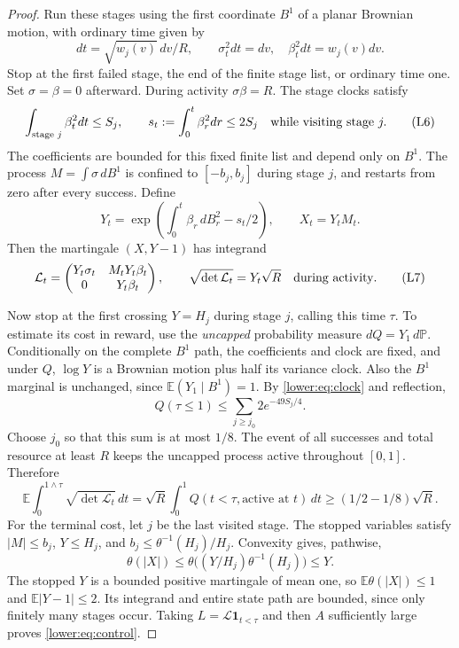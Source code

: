 \documentclass[11pt]{article}
\newcommand{\E}{\mathbb E}
\newcommand{\PP}{\mathbb P}
\numberwithin{equation}{section}
\begin{document}
\begin{proof}
Run these stages using the first coordinate \(B^1\) of a planar
Brownian motion, with ordinary time given by
\[
 dt=\sqrt{w_j(v)}\,dv/R,\qquad
 \sigma_t^2dt=dv,\quad \beta_t^2dt=w_j(v)dv.
\]
Stop at the first failed stage, the end of the finite stage list, or
ordinary time one.  Set \(\sigma=\beta=0\) afterward.  During activity
\(\sigma\beta=R\).  The stage clocks satisfy
\[
 \int_{\text{stage }j}\beta_t^2dt\le S_j,
 \qquad s_t:=\int_0^t\beta_r^2dr\le2S_j
       \quad\hbox{while visiting stage }j.
 \tag{L6}\label{lower:eq:clock}
\]
The coefficients are bounded for this fixed finite list and depend
only on \(B^1\).  The process \(M=\int\sigma\,dB^1\) is confined
to \([-b_j,b_j]\) during stage \(j\), and restarts from zero after
every success.  Define
\[
 Y_t=\exp\left(\int_0^t\beta_r\,dB_r^2-s_t/2\right),
 \qquad X_t=Y_tM_t.
\]
Then the martingale \((X,Y-1)\) has integrand
\[
 \mathcal L_t=
 \begin{pmatrix}Y_t\sigma_t&M_tY_t\beta_t\\0&Y_t\beta_t\end{pmatrix},
 \qquad \sqrt{\det\mathcal L_t}=Y_t\sqrt R
       \quad\hbox{during activity}.
 \tag{L7}\label{lower:eq:triangular}
\]

Now stop at the first crossing \(Y=H_j\) during stage \(j\), calling
this time \(\tau\).  To estimate its cost in reward, use the
\emph{uncapped} probability measure \(dQ=Y_1\,d\PP\).
Conditionally on the complete \(B^1\) path, the coefficients and
clock are fixed, and under \(Q\), \(\log Y\) is a Brownian motion
plus half its variance clock.  Also the \(B^1\) marginal is unchanged,
since \(\E(Y_1\mid B^1)=1\).  By \eqref{lower:eq:clock} and reflection,
\[
 Q(\tau\le1)\le\sum_{j\ge j_0}2e^{-49S_j/4}.
\]
Choose \(j_0\) so that this sum is at most \(1/8\).  The event of
all successes and total resource at least \(R\) keeps the uncapped
process active throughout \([0,1]\).  Therefore
\[
 \E\int_0^{1\wedge\tau}\sqrt{\det\mathcal L_t}\,dt
 =\sqrt R\int_0^1Q(t<\tau,\text{active at }t)\,dt
 \ge(1/2-1/8)\sqrt R.
\]
For the terminal cost, let \(j\) be the last visited stage.  The
stopped variables satisfy \(|M|\le b_j\), \(Y\le H_j\), and
\(b_j\le\theta^{-1}(H_j)/H_j\).  Convexity gives, pathwise,
\[
 \theta(|X|)\le
 \theta\big((Y/H_j)\theta^{-1}(H_j)\big)\le Y.
\]
The stopped \(Y\) is a bounded positive martingale of mean one, so
\(\E\theta(|X|)\le1\) and \(\E|Y-1|\le2\).  Its integrand and
entire state path are bounded, since only finitely many stages occur.
Taking \(L=\mathcal L\mathbf1_{t<\tau}\) and then \(A\) sufficiently
large proves \eqref{lower:eq:control}.
\end{proof}
\end{document}
